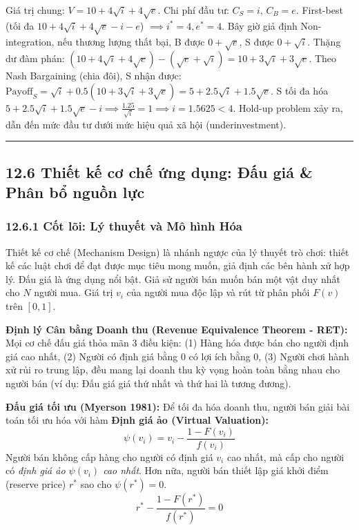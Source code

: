 \documentclass[
]{article}
\begin{document}
Giá trị chung: \(V = 10 + 4\sqrt{i} + 4\sqrt{e}\). Chi phí đầu tư:
\(C_S = i\), \(C_B = e\). First-best (tối đa
\(10 + 4\sqrt{i} + 4\sqrt{e} - i - e\)) \(\implies i^* = 4, e^* = 4\).
Bây giờ giả định Non-integration, nếu thương lượng thất bại, B được
\(0 + \sqrt{e}\), S được \(0 + \sqrt{i}\). Thặng dư đàm phán:
\((10 + 4\sqrt{i} + 4\sqrt{e}) - (\sqrt{e} + \sqrt{i}) = 10 + 3\sqrt{i} + 3\sqrt{e}\).
Theo Nash Bargaining (chia đôi), S nhận được:
\(\text{Payoff}_S = \sqrt{i} + 0.5(10 + 3\sqrt{i} + 3\sqrt{e}) = 5 + 2.5\sqrt{i} + 1.5\sqrt{e}\).
S tối đa hóa
\(5 + 2.5\sqrt{i} + 1.5\sqrt{e} - i \implies \frac{1.25}{\sqrt{i}} = 1 \implies i = 1.5625 < 4\).
Hold-up problem xảy ra, dẫn đến mức đầu tư dưới mức hiệu quả xã hội
(underinvestment).

\begin{center}\rule{0.5\linewidth}{0.5pt}\end{center}

\subsection{12.6 Thiết kế cơ chế ứng dụng: Đấu giá \& Phân bổ nguồn
lực}\label{thiux1ebft-kux1ebf-cux1a1-chux1ebf-ux1ee9ng-dux1ee5ng-ux111ux1ea5u-giuxe1-phuxe2n-bux1ed5-nguux1ed3n-lux1ef1c}

\subsubsection{12.6.1 Cốt lõi: Lý thuyết và Mô hình
Hóa}\label{cux1ed1t-luxf5i-luxfd-thuyux1ebft-vuxe0-muxf4-huxecnh-huxf3a-5}

Thiết kế cơ chế (Mechanism Design) là nhánh ngược của lý thuyết trò
chơi: thiết kế các luật chơi để đạt được mục tiêu mong muốn, giả định
các bên hành xử hợp lý. Đấu giá là ứng dụng nổi bật. Giả sử người bán
muốn bán một vật duy nhất cho \(N\) người mua. Giá trị \(v_i\) của người
mua độc lập và rút từ phân phối \(F(v)\) trên \([0, 1]\).

\textbf{Định lý Cân bằng Doanh thu (Revenue Equivalence Theorem - RET):}
Mọi cơ chế đấu giá thỏa mãn 3 điều kiện: (1) Hàng hóa được bán cho người
định giá cao nhất, (2) Người có định giá bằng 0 có lợi ích bằng 0, (3)
Người chơi hành xử rủi ro trung lập, đều mang lại doanh thu kỳ vọng hoàn
toàn bằng nhau cho người bán (ví dụ: Đấu giá giá thứ nhất và thứ hai là
tương đương).

\textbf{Đấu giá tối ưu (Myerson 1981):} Để tối đa hóa doanh thu, người
bán giải bài toán tối ưu hóa với hàm \textbf{Định giá ảo (Virtual
Valuation):} \[ \psi(v_i) = v_i - \frac{1 - F(v_i)}{f(v_i)} \] Người bán
không cấp hàng cho người có định giá \(v_i\) cao nhất, mà cấp cho người
có \emph{định giá ảo \(\psi(v_i)\) cao nhất}. Hơn nữa, người bán thiết
lập giá khởi điểm (reserve price) \(r^*\) sao cho \(\psi(r^*) = 0\).
\[ r^* - \frac{1 - F(r^*)}{f(r^*)} = 0 \]
\end{document}
